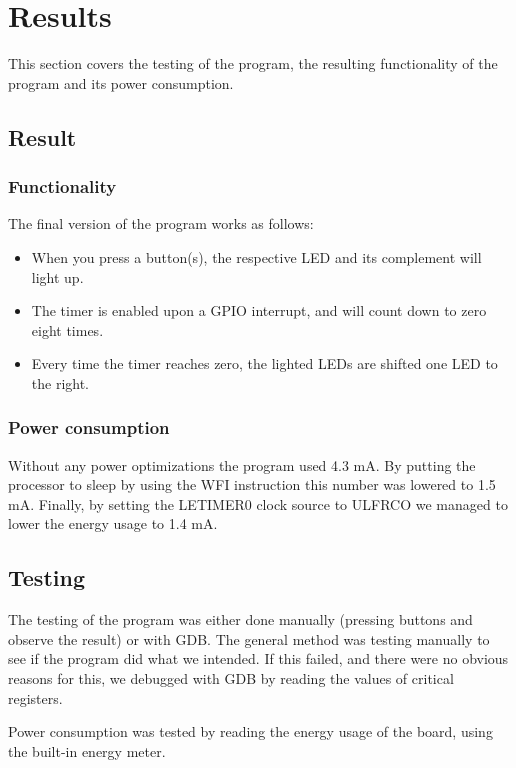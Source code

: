 \section{Results}\label{chapter:Results and Tests}

This section covers the testing of the program, the resulting functionality of the program and its power consumption.

\subsection{Result}

\subsubsection{Functionality}
The final version of the program works as follows:

\begin{itemize}
	\item When you press a button(s), the respective LED and its complement will light up.
	\item The timer is enabled upon a GPIO interrupt, and will count down to zero eight times.
	\item Every time the timer reaches zero, the lighted LEDs are shifted one LED to the right. 
\end{itemize}

\subsubsection{Power consumption}

Without any power optimizations the program used 4.3 mA. By putting the processor to sleep by using the WFI instruction this number was lowered to 1.5 mA. Finally, by setting the LETIMER0 clock source to ULFRCO we managed to lower the energy usage to 1.4 mA. 

\subsection{Testing}

The testing of the program was either done manually (pressing buttons and observe the result) or with GDB. The general method was testing manually to see if the program did what we intended. If this failed, and there were no obvious reasons for this, we debugged with GDB by reading the values of critical registers. 

Power consumption was tested by reading the energy usage of the board, using the built-in energy meter.




